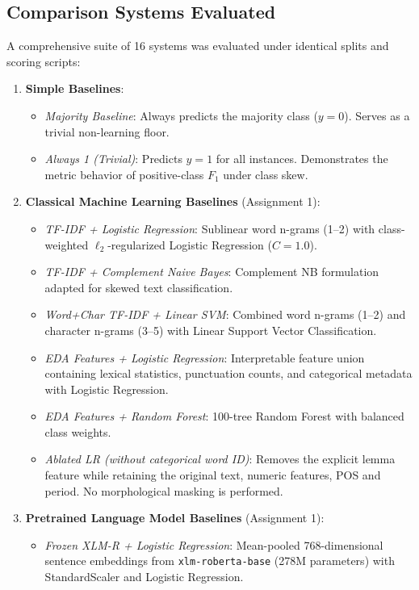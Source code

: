 \subsection{Comparison Systems Evaluated}
A comprehensive suite of 16 systems was evaluated under identical splits and scoring scripts:
\begin{enumerate}
    \item \textbf{Simple Baselines}:
    \begin{itemize}
        \item \textit{Majority Baseline}: Always predicts the majority class ($y=0$). Serves as a trivial non-learning floor.
        \item \textit{Always 1 (Trivial)}: Predicts $y=1$ for all instances. Demonstrates the metric behavior of positive-class $F_1$ under class skew.
    \end{itemize}
    \item \textbf{Classical Machine Learning Baselines} (Assignment 1):
    \begin{itemize}
        \item \textit{TF-IDF + Logistic Regression}: Sublinear word n-grams (1--2) with class-weighted $\ell_2$-regularized Logistic Regression ($C=1.0$).
        \item \textit{TF-IDF + Complement Naive Bayes}: Complement NB formulation adapted for skewed text classification.
        \item \textit{Word+Char TF-IDF + Linear SVM}: Combined word n-grams (1--2) and character n-grams (3--5) with Linear Support Vector Classification.
        \item \textit{EDA Features + Logistic Regression}: Interpretable feature union containing lexical statistics, punctuation counts, and categorical metadata with Logistic Regression.
        \item \textit{EDA Features + Random Forest}: 100-tree Random Forest with balanced class weights.
        \item \textit{Ablated LR (without categorical word ID)}: Removes the explicit lemma feature while retaining the original text, numeric features, POS and period. No morphological masking is performed.
    \end{itemize}
    \item \textbf{Pretrained Language Model Baselines} (Assignment 1):
    \begin{itemize}
        \item \textit{Frozen XLM-R + Logistic Regression}: Mean-pooled 768-dimensional sentence embeddings from \texttt{xlm-roberta-base} (278M parameters) with StandardScaler and Logistic Regression.

\end{itemize}
\end{enumerate}
